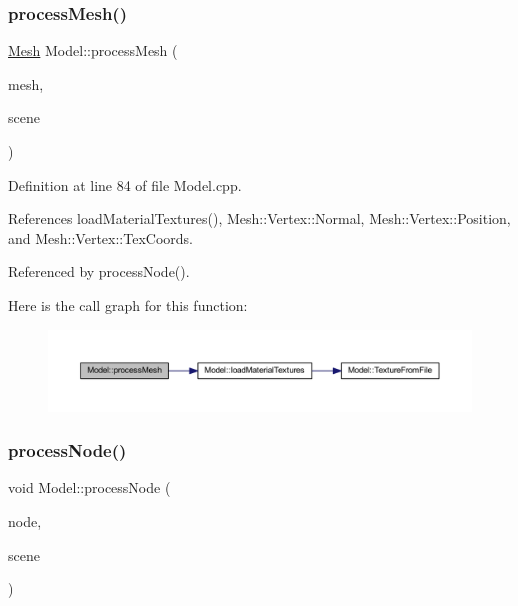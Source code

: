 \subsubsection{\texorpdfstring{process\+Mesh()}{processMesh()}}
{\footnotesize\ttfamily \mbox{\hyperlink{classMesh}{Mesh}} Model\+::process\+Mesh (\begin{DoxyParamCaption}\item[{ai\+Mesh $\ast$}]{mesh,  }\item[{const ai\+Scene $\ast$}]{scene }\end{DoxyParamCaption})\hspace{0.3cm}{\ttfamily [protected]}}



Definition at line 84 of file Model.\+cpp.



References load\+Material\+Textures(), Mesh\+::\+Vertex\+::\+Normal, Mesh\+::\+Vertex\+::\+Position, and Mesh\+::\+Vertex\+::\+Tex\+Coords.



Referenced by process\+Node().

Here is the call graph for this function\+:\nopagebreak
\begin{figure}[H]
\begin{center}
\leavevmode
\includegraphics[width=350pt]{classModel_a95ae1a9980ded3d98b1c8785cb889d96_cgraph}
\end{center}
\end{figure}
\mbox{\label{classModel_a23b167ce0d33f7e6ab5693cd5e81a9a5}} 
\subsubsection{\texorpdfstring{process\+Node()}{processNode()}}
{\footnotesize\ttfamily void Model\+::process\+Node (\begin{DoxyParamCaption}\item[{ai\+Node $\ast$}]{node,  }\item[{const ai\+Scene $\ast$}]{scene }\end{DoxyParamCaption})\hspace{0.3cm}{\ttfamily [protected]}}



